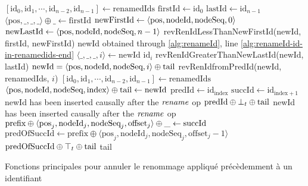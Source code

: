 \begin{algorithm}[!ht]
  \footnotesize
  \begin{algorithmic}[1]

        \Statex
        \State $[\text{id}_0, \text{id}_1, \cdots, \text{id}_{n-2}, \text{id}_{n-1}] \leftarrow \text{renamedIds}$
        \State $\text{firstId} \gets \text{id}_0$
        \State $\text{lastId} \gets \text{id}_{n - 1}$
        \State $\langle \text{pos}, \_, \_, \_ \rangle \oplus \text{\_} \leftarrow \text{firstId}$
        \State $\text{newFirstId} \gets \langle \text{pos},\text{nodeId},\text{nodeSeq},0 \rangle$
        \State $\text{newLastId} \gets \langle \text{pos},\text{nodeId},\text{nodeSeq},n-1 \rangle$
        \Statex
          \State \Return revRenIdLessThanNewFirstId(newId, firstId, newFirstId)
            \label{alg:revertRenameId-in-former-state}
            \Statex \Comment newId obtained through \autoref{alg:renameId}, line \ref{alg:renameId-id-in-renamedids-end}
            \State $\langle \_,\_,\_,i \rangle \leftarrow \text{newId}$
            \State \Return $\text{id}_i$ \label{alg:revertRenameId-case-i}
            \State \Return revRenIdGreaterThanNewLastId(newId, lastId)
        \Else
            \Statex \Comment $\text{newId} = \langle \text{pos},\text{nodeId},\text{nodeSeq},{i} \rangle \oplus \text{tail}$
            \State \Return revRenIdfromPredId(newId, renamedIds, $i$)
        \EndIf
    \EndFunction
    \Statex
        \Statex
        \State $[\text{id}_0, \text{id}_1, \cdots, \text{id}_{n-2}, \text{id}_{n-1}] \leftarrow \text{renamedIds}$
        \State $\langle \text{pos},\text{nodeId},\text{nodeSeq},{\text{index}} \rangle \oplus \text{tail} \leftarrow \text{newId}$
        \State $\text{predId} \gets \text{id}_{\text{index}}$
        \State $\text{succId} \gets \text{id}_{\text{index}+1}$
        \Statex
            \Statex \Comment newId has been inserted causally after the $\mathit{rename}$ op
            \State \Return $\text{predId} \oplus \bot_t \oplus \text{tail}$ \Comment \commentbott \label{alg:revertRenameId-case-iii}
            \Statex \Comment newId has been inserted causally after the $\mathit{rename}$ op
            \State $\text{prefix} \oplus \langle \text{pos}_{j},\text{nodeId}_{j},\text{nodeSeq}_{j},\text{offset}_{j} \rangle \oplus \_ \leftarrow \text{succId}$
            \State $\text{predOfSuccId} \gets \text{prefix} \oplus \langle \text{pos}_j,\text{nodeId}_j,\text{nodeSeq}_j,\text{offset}_{j} - 1 \rangle$
            \State \Return $\text{predOfSuccId} \oplus \top_t \oplus \text{tail}$ \Comment \commenttopt
        \Else
            \State \Return tail \label{alg:revertRenameId-case-ii}
        \EndIf
    \EndFunction
  \end{algorithmic}
  \caption{Fonctions principales pour annuler le renommage appliqué précèdemment à un identifiant}
  \label{alg:revertRenameId}
\end{algorithm}

